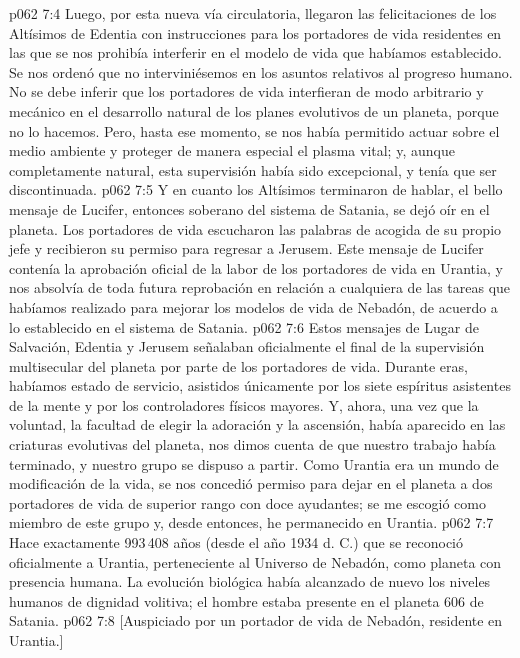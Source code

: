 \vs p062 7:4 Luego, por esta nueva vía circulatoria, llegaron las felicitaciones de los Altísimos de Edentia con instrucciones para los portadores de vida residentes en las que se nos prohibía interferir en el modelo de vida que habíamos establecido. Se nos ordenó que no interviniésemos en los asuntos relativos al progreso humano. No se debe inferir que los portadores de vida interfieran de modo arbitrario y mecánico en el desarrollo natural de los planes evolutivos de un planeta, porque no lo hacemos. Pero, hasta ese momento, se nos había permitido actuar sobre el medio ambiente y proteger de manera especial el plasma vital; y, aunque completamente natural, esta supervisión había sido excepcional, y tenía que ser discontinuada.
\vs p062 7:5 Y en cuanto los Altísimos terminaron de hablar, el bello mensaje de Lucifer, entonces soberano del sistema de Satania, se dejó oír en el planeta. Los portadores de vida escucharon las palabras de acogida de su propio jefe y recibieron su permiso para regresar a Jerusem. Este mensaje de Lucifer contenía la aprobación oficial de la labor de los portadores de vida en Urantia, y nos absolvía de toda futura reprobación en relación a cualquiera de las tareas que habíamos realizado para mejorar los modelos de vida de Nebadón, de acuerdo a lo establecido en el sistema de Satania.
\vs p062 7:6 Estos mensajes de Lugar de Salvación, Edentia y Jerusem señalaban oficialmente el final de la supervisión multisecular del planeta por parte de los portadores de vida. Durante eras, habíamos estado de servicio, asistidos únicamente por los siete espíritus asistentes de la mente y por los controladores físicos mayores. Y, ahora, una vez que la voluntad, la facultad de elegir la adoración y la ascensión, había aparecido en las criaturas evolutivas del planeta, nos dimos cuenta de que nuestro trabajo había terminado, y nuestro grupo se dispuso a partir. Como Urantia era un mundo de modificación de la vida, se nos concedió permiso para dejar en el planeta a dos portadores de vida de superior rango con doce ayudantes; se me escogió como miembro de este grupo y, desde entonces, he permanecido en Urantia.
\vs p062 7:7 Hace exactamente 993\,408 años (desde el año 1934 d. C.) que se reconoció oficialmente a Urantia, perteneciente al Universo de Nebadón, como planeta con presencia humana. La evolución biológica había alcanzado de nuevo los niveles humanos de dignidad volitiva; el hombre estaba presente en el planeta 606 de Satania.
\vsetoff
\vs p062 7:8 [Auspiciado por un portador de vida de Nebadón, residente en Urantia.]
